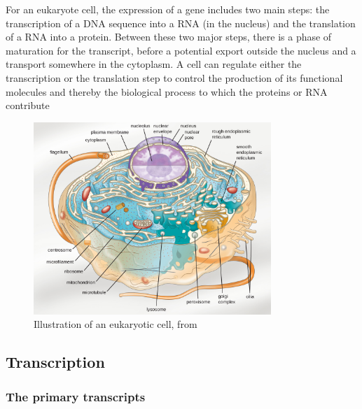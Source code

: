 For an eukaryote cell, the expression of a gene includes two main steps: the transcription of a \ac{DNA} sequence into a \ac{RNA} (in the nucleus) and the translation of a \ac{RNA} into a protein.
Between these two major steps, there is a phase of maturation for the transcript, before a potential export outside the nucleus and a transport somewhere in the cytoplasm.
A cell can regulate either the transcription or the translation step to control the production of its functional molecules and thereby the biological process to which the proteins or \ac{RNA} contribute

\begin{figure}[]
    \centering
    \includegraphics[width=0.8\textwidth]{figures/introduction/cell_eukaryotic.jpg}
    \caption[Illustration of an eukaryotic cell]{Illustration of an eukaryotic cell, from~\cite{parker2017microbiology}}
    \label{fig:eukaryotic_cell}
\end{figure}

\subsection{Transcription}
\label{subsec:intro_transcription}

\subsubsection{The primary transcripts}

